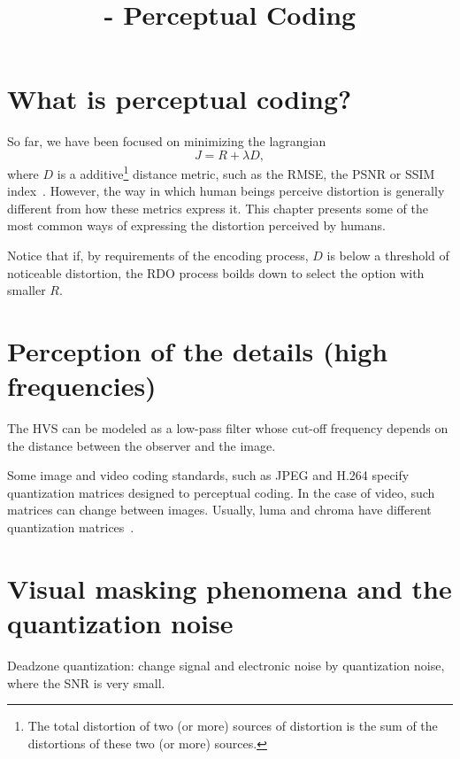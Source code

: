 

\title{\SM{} - Perceptual Coding}

\maketitle
\tableofcontents

\section{What is perceptual coding?}

So far, we have been focused on minimizing the lagrangian~\cite{sullivan1998rate}
\begin{equation}
  J = R + \lambda D,
\end{equation}
where $D$ is a additive\footnote{The total distortion of two (or more)
sources of distortion is the sum of the distortions of these two (or
more) sources.} distance metric, such as the RMSE, the PSNR or SSIM
index~\cite{wang2004image}. However, the way in which human beings
perceive distortion is generally different from how these metrics
express it. This chapter presents some of the most common ways of
expressing the distortion perceived by humans.

Notice that if, by requirements of the encoding process, $D$ is below
a threshold of noticeable distortion, the RDO process boilds down to
select the option with smaller $R$.

\section{Perception of the details (high frequencies)}
The HVS can be modeled as a low-pass filter whose cut-off frequency
depends on the distance between the observer and the image.

Some image and video coding standards, such as JPEG and H.264 specify
quantization matrices designed to perceptual coding. In the case of
video, such matrices can change between images. Usually, luma and
chroma have different quantization
matrices~\cite{naccari2014perceptually}.

\section{Visual masking phenomena and the quantization noise}
Deadzone quantization: change signal and electronic noise by
quantization noise, where the SNR is very small.

